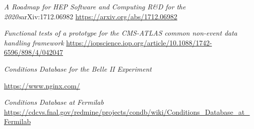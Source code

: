 \documentclass[pdftex,12pt,letter]{article}
\begin{document}
\clearpage
\begin{thebibliography}{1}

{\textit{A Roadmap for HEP Software and Computing R\&D for the 2020s}arXiv:1712.06982} \url{https://arxiv.org/abs/1712.06982}

{\textit{Functional tests of a prototype for the CMS-ATLAS common non-event data handling framework}} \url{https://iopscience.iop.org/article/10.1088/1742-6596/898/4/042047}

{\textit{Conditions Database for the Belle II Experiment}}

{\url{https://www.nginx.com/}}

{\textit{Conditions Database at Fermilab}  \url{https://cdcvs.fnal.gov/redmine/projects/condb/wiki/Conditions_Database_at_Fermilab}}

\end{thebibliography}
\end{document}
